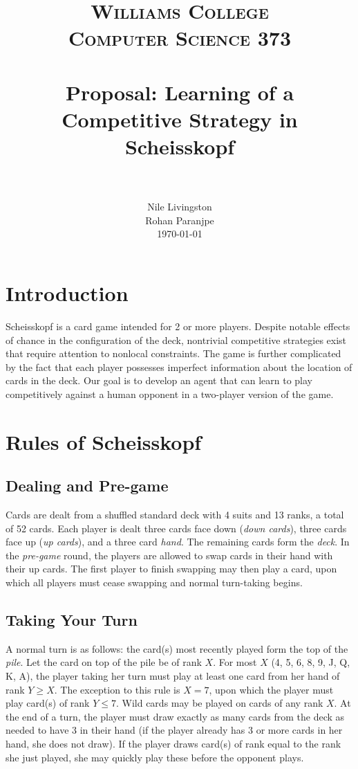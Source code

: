 \documentclass[paper=a4, fontsize=11pt]{scrartcl}
\title{
		\usefont{OT1}{bch}{b}{n}
		\normalfont \normalsize \textsc{Williams College \\ Computer Science 373} \\ [25pt]
		\horrule{0.5pt} \\[0.4cm]
		\huge Proposal: Learning of a Competitive Strategy in Scheisskopf \\
		\horrule{2pt} \\[0.5cm]
}
\author{
\normalfont 								
\normalsize Nile Livingston \\ 
\normalsize Rohan Paranjpe \\ 
\normalsize
\today
}
\date{}
\numberwithin{equation}{section}		%
\numberwithin{figure}{section}			%
\numberwithin{table}{section}				%
\begin{document}
\maketitle
\section{Introduction}
Scheisskopf is a card game intended for 2 or more players. Despite notable effects of chance in the configuration of the deck, nontrivial competitive strategies exist that require attention to nonlocal constraints. The game is further complicated by the fact that each player possesses imperfect information about the location of cards in the deck. Our goal is to develop an agent that can learn to play competitively against a human opponent in a two-player version of the game.

\section{Rules of Scheisskopf}

\subsection{Dealing and Pre-game}
Cards are dealt from a shuffled standard deck with 4 suits and 13 ranks, a total of 52 cards. Each player is dealt three cards face down (\emph{down cards}), three cards face up (\emph{up cards}), and a three card \emph{hand}. The remaining cards form the \emph{deck}. In the \emph{pre-game} round, the players are allowed to swap cards in their hand with their up cards. The first player to finish swapping may then play a card, upon which all players must cease swapping and normal turn-taking begins. 
	
\subsection{Taking Your Turn}
A normal turn is as follows: the card(s) most recently played form the top of the \emph{pile}. Let the card on top of the pile be of rank $X$. For most $X$ (4, 5, 6, 8, 9, J, Q, K, A), the player taking her turn must play at least one card from her hand of rank $Y \geq X$. The exception to this rule is $X=7$, upon which the player must play card(s) of rank $Y \leq 7$. Wild cards may be played on cards of any rank $X$. At the end of a turn, the player must draw exactly as many cards from the deck as needed to have 3 in their hand (if the player already has 3 or more cards in her hand, she does not draw). If the player draws card(s) of rank equal to the rank she just played, she may quickly play these before the opponent plays. 
\end{document}
